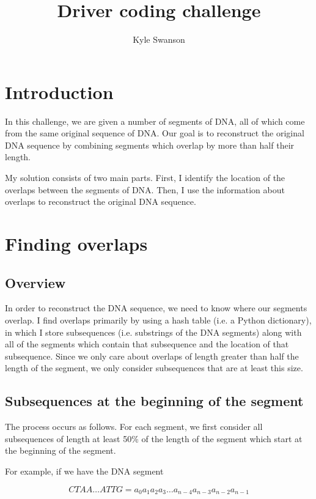 \documentclass{article}
\title{Driver coding challenge}
\author{Kyle Swanson}
\begin{document}
\maketitle

\section{Introduction}

In this challenge, we are given a number of segments of DNA, all of which come from the same original sequence of DNA. Our goal is to reconstruct the original DNA sequence by combining segments which overlap by more than half their length.

My solution consists of two main parts. First, I identify the location of the overlaps between the segments of DNA. Then, I use the information about overlaps to reconstruct the original DNA sequence.

\section{Finding overlaps}

\subsection{Overview}

In order to reconstruct the DNA sequence, we need to know where our segments overlap. I find overlaps primarily by using a hash table (i.e. a Python dictionary), in which I store subsequences (i.e. substrings of the DNA segments) along with all of the segments which contain that subsequence and the location of that subsequence. Since we only care about overlaps of length greater than half the length of the segment, we only consider subsequences that are at least this size.

\subsection{Subsequences at the beginning of the segment}

The process occurs as follows. For each segment, we first consider all subsequences of length at least 50\% of the length of the segment which start at the beginning of the segment.

For example, if we have the DNA segment

$$CTAA \dots ATTG = a_0 a_1 a_2 a_3 \dots a_{n-4} a_{n-3} a_{n-2} a_{n-1}$$
\end{document}
